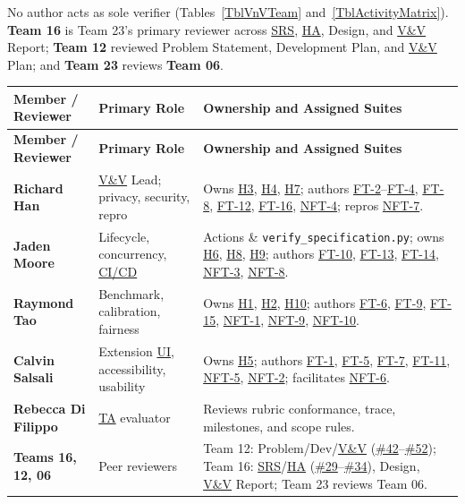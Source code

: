 \documentclass[12pt, titlepage]{article}
\newcommand{\CICD}{\hyperlink{vnv-acr-cicd}{CI/CD}}
\newcommand{\HA}{\hyperlink{vnv-acr-ha}{HA}}
\newcommand{\SRS}{\hyperlink{vnv-acr-srs}{SRS}}
\newcommand{\TA}{\hyperlink{vnv-acr-ta}{TA}}
\newcommand{\UI}{\hyperlink{vnv-acr-ui}{UI}}
\newcommand{\VnV}{\hyperlink{vnv-acr-vnv}{V\&V}}
\begin{document}
No author acts as sole verifier (Tables~\ref{TblVnVTeam} and~\ref{TblActivityMatrix}). \textbf{Team 16} is Team 23's primary reviewer across \SRS{}, \HA{}, Design, and \VnV{} Report; \textbf{Team 12} reviewed Problem Statement, Development Plan, and \VnV{} Plan; and \textbf{Team 23} reviews \textbf{Team 06}.

\begingroup\small
\renewcommand{\arraystretch}{0.95}
\setlength{\tabcolsep}{4pt}
\begin{tabularx}{\textwidth}{P{2.8cm} P{3.0cm} Y}
\caption[V\&V Team Roles]{Verification and Validation Team Roles and Responsibilities} \label{TblVnVTeam}\\
\toprule
\textbf{Member / Reviewer} & \textbf{Primary Role} & \textbf{Ownership and Assigned Suites}\\
\midrule
\endfirsthead
\toprule
\textbf{Member / Reviewer} & \textbf{Primary Role} & \textbf{Ownership and Assigned Suites}\\
\midrule
\endhead
\bottomrule
\endfoot
\textbf{Richard Han} & \VnV{} Lead; privacy, security, repro & Owns \hyperref[haz:H3]{H3}, \hyperref[haz:H4]{H4}, \hyperref[haz:H7]{H7}; authors \hyperref[test:FT-2]{FT-2}--\hyperref[test:FT-4]{FT-4}, \hyperref[test:FT-8]{FT-8}, \hyperref[test:FT-12]{FT-12}, \hyperref[test:FT-16]{FT-16}, \hyperref[test:NFT-4]{NFT-4}; repros \hyperref[test:NFT-7]{NFT-7}.\\
\textbf{Jaden Moore} & Lifecycle, concurrency, \CICD{} & Actions \& \texttt{verify\_\allowbreak{}specification.py}; owns \hyperref[haz:H6]{H6}, \hyperref[haz:H8]{H8}, \hyperref[haz:H9]{H9}; authors \hyperref[test:FT-10]{FT-10}, \hyperref[test:FT-13]{FT-13}, \hyperref[test:FT-14]{FT-14}, \hyperref[test:NFT-3]{NFT-3}, \hyperref[test:NFT-8]{NFT-8}.\\
\textbf{Raymond Tao} & Benchmark, calibration, fairness & Owns \hyperref[haz:H1]{H1}, \hyperref[haz:H2]{H2}, \hyperref[haz:H10]{H10}; authors \hyperref[test:FT-6]{FT-6}, \hyperref[test:FT-9]{FT-9}, \hyperref[test:FT-15]{FT-15}, \hyperref[test:NFT-1]{NFT-1}, \hyperref[test:NFT-9]{NFT-9}, \hyperref[test:NFT-10]{NFT-10}.\\
\textbf{Calvin Salsali} & Extension \UI{}, accessibility, usability & Owns \hyperref[haz:H5]{H5}; authors \hyperref[test:FT-1]{FT-1}, \hyperref[test:FT-5]{FT-5}, \hyperref[test:FT-7]{FT-7}, \hyperref[test:FT-11]{FT-11}, \hyperref[test:NFT-5]{NFT-5}, \hyperref[test:NFT-2]{NFT-2}; facilitates \hyperref[test:NFT-6]{NFT-6}.\\
\textbf{Rebecca Di Filippo} & \TA{} evaluator & Reviews rubric conformance, trace, milestones, and scope rules.\\
\textbf{Teams 16, 12, 06} & Peer reviewers & Team 12: Problem/Dev/\VnV{} (\href{https://github.com/richy1337/Verity/issues/42}{\#42}--\href{https://github.com/richy1337/Verity/issues/52}{\#52}); Team 16: \SRS{}/\HA{} (\href{https://github.com/richy1337/Verity/issues/29}{\#29}--\href{https://github.com/richy1337/Verity/issues/34}{\#34}), Design, \VnV{} Report; Team 23 reviews Team 06.\\
\end{tabularx}
\endgroup
\end{document}

